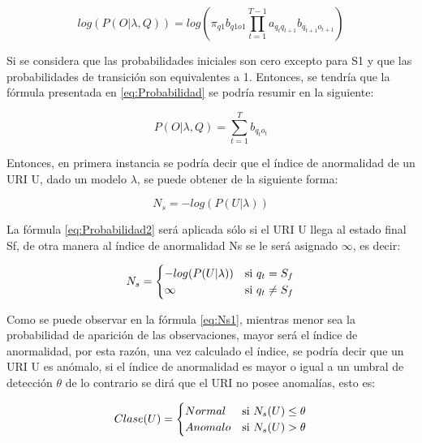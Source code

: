 \begin{equation}\label{eq:Probabilidad}
log(P(O|\lambda,Q)) = log(\pi_{q1}b_{q1o1}\prod_{t=1}^{T-1}a_{q_{t}q_{t+1}}b_{q_{t+1}o_{t+1}})
\end{equation}

Si se considera que las probabilidades iniciales son cero excepto para S1 y que las probabilidades de transición son equivalentes a 1. Entonces, se tendría que la fórmula presentada en \ref{eq:Probabilidad} se podría resumir en la siguiente:

\begin{equation}
P(O|\lambda,Q) = \sum_{t=1}^{T}b_{q_{t}o_{t}}
\end{equation}

Entonces, en primera instancia se podría decir que el índice de anormalidad de un URI U, dado un modelo $\lambda$, se puede obtener de la siguiente forma:

\begin{equation}\label{eq:Probabilidad2}
N_{s} = -log(P(U|\lambda))
\end{equation}

La fórmula \ref{eq:Probabilidad2} será aplicada sólo si el URI U llega al estado final Sf, de otra manera al índice de anormalidad Ns se le será asignado $\infty$, es decir:

\begin{equation}\label{eq:Ns1}
N_{s} = 
	\begin{cases} 
      -log(P(U|\lambda)) & $si $  q_{t} = S_{f} \\
      \infty & $si $  q_{t} \neq S_{f} \\ 
   \end{cases}
\end{equation}

Como se puede observar en la fórmula \ref{eq:Ns1}, mientras menor sea la probabilidad de aparición de las observaciones, mayor será el índice de anormalidad, por esta razón, una vez calculado el índice, se podría decir que un URI U es anómalo, si el índice de anormalidad es mayor o igual a un umbral de detección $\theta$ de lo contrario se dirá que el URI no posee anomalías, esto es:

\begin{equation}\label{eq:ClaseU}
Clase(U) = 
	\begin{cases} 
      Normal & $si $  N_{s}(U) \leq \theta \\
      Anomalo & $si $  N_{s}(U) > \theta \\ 
   \end{cases}
\end{equation}


